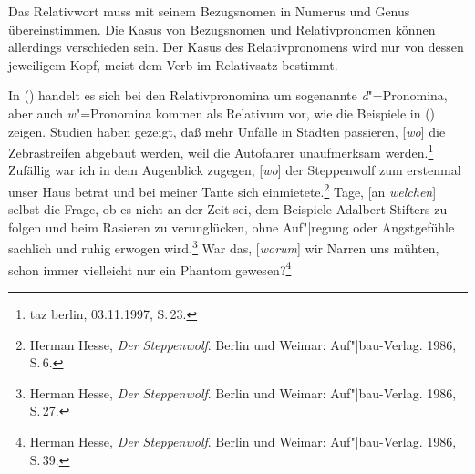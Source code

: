 {Das Relativwort muss mit seinem Bezugsnomen in Numerus und Genus übereinstimmen. Die Kasus von
Bezugsnomen und Relativpronomen können allerdings verschieden sein. Der Kasus des Relativpronomens
wird nur von dessen jeweiligem Kopf, meist dem Verb im Relativsatz bestimmt.

In () handelt es sich bei den Relativpronomina um sogenannte \emph{d}"=Pronomina, aber
auch \emph{w}"=Pronomina kommen als Relativum vor, wie die Beispiele in () zeigen.
\eal
\label{bsp-rs-w-pron}
\ex Studien haben gezeigt, daß mehr Unfälle in Städten passieren, [\hspace{-.2ex}\emph{wo}] 
      die Zebrastreifen abgebaut werden, weil die Autofahrer unaufmerksam werden.\footnote{
        taz berlin, 03.11.1997, S.\,23.
        }
\ex Zufällig war ich in dem Augenblick zugegen, [\hspace{-.2ex}\emph{wo}] der Steppenwolf 
      zum erstenmal unser Haus betrat und bei meiner Tante sich einmietete.\footnote{
                Herman Hesse, \emph{Der Steppenwolf}. Berlin und Weimar: Auf"|bau-Verlag. 1986, S.\,6.
	}
\ex Tage, [an \emph{welchen}] selbst die Frage, ob es nicht an der Zeit sei, dem Beispiele
      Adalbert Stifters zu folgen und beim Rasieren zu verunglücken, ohne Auf"|regung
      oder Angstgefühle sachlich und ruhig erwogen wird,\footnote{
		Herman Hesse, \emph{Der Steppenwolf}. Berlin und Weimar: Auf"|bau-Verlag. 1986, S.\,27.
	}
\ex War das, [\hspace{-.2ex}\emph{worum}] wir Narren uns mühten, schon immer vielleicht nur ein Phantom gewesen?\footnote{
		Herman Hesse, \emph{Der Steppenwolf}. Berlin und Weimar: Auf"|bau-Verlag. 1986, S.\,39.
	}

}
